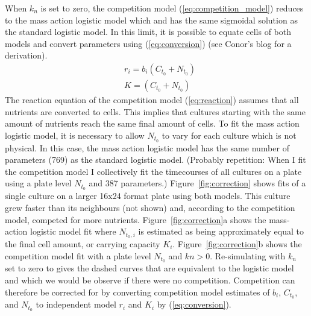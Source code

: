 When \(k_{n}\) is set to zero, the competition model
(\ref{eq:competition_model}) reduces to the mass action logistic model
which and has the same sigmoidal solution as the standard logistic
model. In this limit, it is possible to equate cells of both models
and convert parameters using (\ref{eq:conversion}) (see Conor's blog
for a derivation).
\begin{subequations}
  \label{eq:conversion}
  \begin{align}
    &r_{i} = b_{i}(C_{t_{0}} + N_{t_{0}})\\
    &K = (C_{t_{0}} + N_{t_{0}})
  \end{align}
\end{subequations}
%
The reaction equation of the competition model (\ref{eq:reaction})
assumes that all nutrients are converted to cells. This implies that
cultures starting with the same amount of nutrients reach the same
final amount of cells. To fit the mass action logistic model, it is
necessary to allow \(N_{t_{0}}\) to vary for each culture which is not
physical. In this case, the mass action logistic model has the same
number of parameters (769) as the standard logistic model. (Probably
repetition: When I fit the competition model I collectively fit the
timecourses of all cultures on a plate using a plate level
\(N_{t_{0}}\) and 387 parameters.)
%
Figure~\ref{fig:correction} shows fits of a single culture on a larger
16x24 format plate using both models. This culture grew faster than
its neighbours (not shown) and, according to the competition model,
competed for more nutrients.
%
Figure~\ref{fig:correction}a shows the mass-action logistic model fit
where \(N_{t_{0},i}\) is estimated as being approximately equal to the
final cell amount, or carrying capacity \(K_{i}\).
%
Figure~\ref{fig:correction}b shows the competition model fit with a
plate level \(N_{t_{0}}\) and \(kn > 0\). Re-simulating with \(k_{n}\)
set to zero to gives the dashed curves that are equivalent to the
logistic model and which we would be observe if there were no
competition. Competition can therefore be corrected for by converting
competition model estimates of \(b_{i}\), \(C_{t_{0}}\), and
\(N_{t_{0}}\) to independent model \(r_{i}\) and \(K_{i}\) by
(\ref{eq:conversion}).
%

